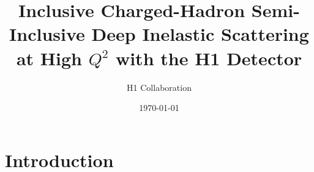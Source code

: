 \documentclass[11pt,a4paper]{article}
\title{Inclusive Charged-Hadron Semi-Inclusive Deep Inelastic Scattering at High $Q^2$ with the H1 Detector}
\author{H1 Collaboration}
\date{\today}
\begin{document}
\maketitle

\section{Introduction}
\end{document}
